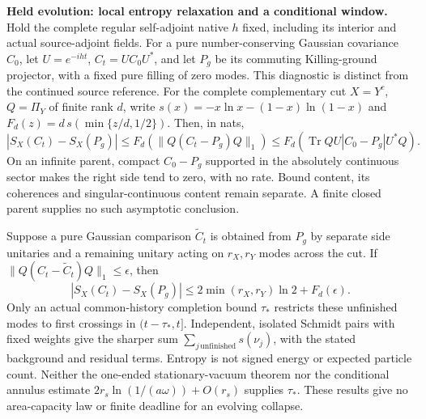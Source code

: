 \documentclass[10pt]{article}
\begin{document}
\setlength{\abovedisplayskip}{4pt}
\setlength{\belowdisplayskip}{4pt}
\noindent\textbf{Held evolution: local entropy relaxation and a conditional window.}
Hold the complete regular self-adjoint native $h$ fixed, including its
interior and actual source-adjoint fields. For a pure number-conserving
Gaussian covariance $C_0$, let $U=e^{-iht}$, $C_t=UC_0U^*$, and let
$P_g$ be its commuting Killing-ground projector,
with a fixed pure filling of zero modes. This diagnostic is distinct from
the continued source reference. For the complete complementary cut
$X=Y^c$, $Q=\Pi_Y$ of finite rank $d$, write
$s(x)=-x\ln x-(1-x)\ln(1-x)$ and
$F_d(z)=d\,s(\min\{z/d,1/2\})$. Then, in nats,
\[
 |S_X(C_t)-S_X(P_g)|
 \leq F_d(\|Q(C_t-P_g)Q\|_1)
 \leq F_d\!\left(\operatorname{Tr}QU|C_0-P_g|U^*Q\right).
\]
On an infinite parent, compact $C_0-P_g$ supported in the absolutely
continuous sector makes the right side tend to zero, with no rate.
Bound content, its coherences and singular-continuous content remain
separate. A finite closed parent supplies no such asymptotic conclusion.

Suppose a pure Gaussian comparison $\widetilde C_t$ is obtained from
$P_g$ by separate side unitaries and a remaining unitary acting on
$r_X,r_Y$ modes across the cut. If
$\|Q(C_t-\widetilde C_t)Q\|_1\leq\epsilon$, then
\[
 |S_X(C_t)-S_X(P_g)|
 \leq2\min(r_X,r_Y)\ln2+F_d(\epsilon).
\]
Only an actual common-history completion bound $\tau_*$ restricts these
unfinished modes to first crossings in $(t-\tau_*,t]$. Independent,
isolated Schmidt pairs with fixed weights give the sharper sum
$\sum_{j\,\mathrm{unfinished}}s(\nu_j)$, with the stated background and
residual terms. Entropy is not signed energy or expected particle count.
Neither the one-ended stationary-vacuum theorem nor the conditional
annulus estimate $2r_s\ln(1/(a\omega))+O(r_s)$ supplies $\tau_*$.
These results give no
area-capacity law or finite deadline for an evolving collapse.
\end{document}
